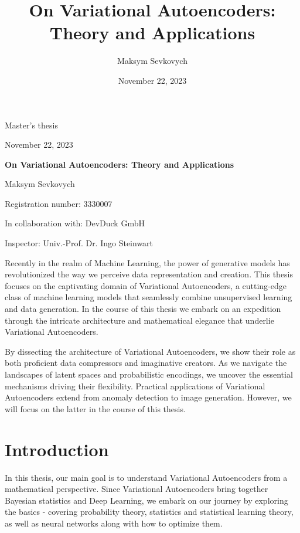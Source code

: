 \documentclass[11pt, twoside, a4paper]{book}
\title{On Variational Autoencoders: Theory and Applications}
\date{November 22, 2023}
\author{Maksym Sevkovych}
\theoremstyle{plain}
\theoremstyle{definition}
\theoremstyle{plain}
\begin{document}
\begin{titlepage}
\vspace*{1 cm}
\begin{center}
\LARGE{Master's thesis}

\vspace{0.5 cm}

\large{November 22, 2023}

\vspace{0.5 cm}

\Huge{\textbf{On Variational Autoencoders: Theory and Applications}}

\vspace{0.5 cm}

\Large{Maksym Sevkovych}

\Large{Registration number: 3330007}

\Large{In collaboration with: DevDuck GmbH}
\vspace{1 cm}

\Large{Inspector: Univ.-Prof. Dr. Ingo Steinwart}
\vspace{3cm}
\end{center}
Recently in the realm of Machine Learning, the power of generative models has revolutionized the way we perceive data representation and creation. This thesis focuses on the captivating domain of Variational Autoencoders, a cutting-edge class of machine learning models that seamlessly combine unsupervised learning and data generation. In the course of this thesis we embark on an expedition through the intricate architecture and mathematical elegance that underlie Variational Autoencoders.

By dissecting the architecture of Variational Autoencoders, we show their role as both proficient data compressors and imaginative creators. As we navigate the landscapes of latent spaces and probabilistic encodings, we uncover the essential mechanisms driving their flexibility.
Practical applications of Variational Autoencoders extend from anomaly detection to image generation. However, we will focus on the latter in the course of this thesis.
\end{titlepage}
\tableofcontents
\newpage
{}
\section*{Introduction}
In this thesis, our main goal is to understand Variational Autoencoders from a mathematical perspective. Since Variational Autoencoders bring together Bayesian statistics and Deep Learning, we embark on our journey by exploring the basics - covering probability theory, statistics and statistical learning theory, as well as neural networks along with how to optimize them.
\end{document}
